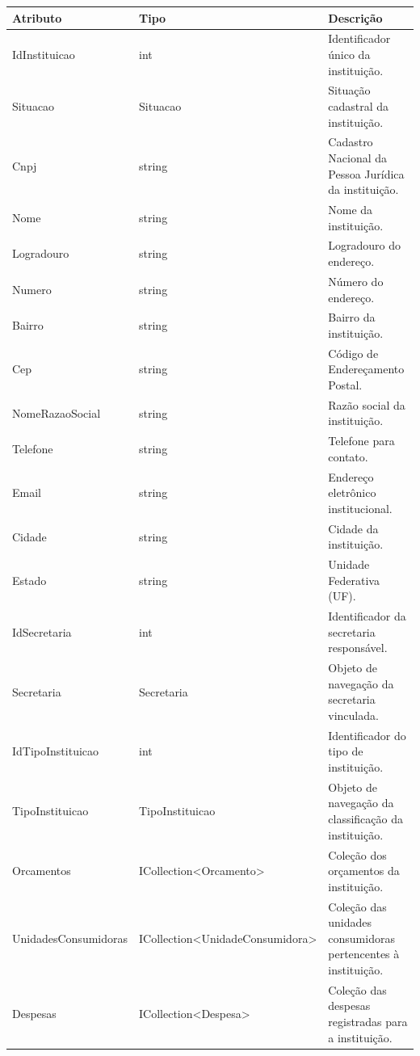 \begin{quadro}[H]
\caption[Dicionário de dados da entidade Instituicao]{Dicionário de dados da entidade Instituicao}
\label{quad:dicionario-de-dados-da-entidade-instituicao}

\begin{tabular}{|p{}|p{}|p{}|}
\hline
\textbf{Atributo} & \textbf{Tipo} & \textbf{Descrição} \\ 
\hline
IdInstituicao & int & Identificador único da instituição. \\ 
\hline
Situacao & Situacao & Situação cadastral da instituição. \\ 
\hline
Cnpj & string & Cadastro Nacional da Pessoa Jurídica da instituição. \\ 
\hline
Nome & string & Nome da instituição. \\ 
\hline
Logradouro & string & Logradouro do endereço. \\ 
\hline
Numero & string & Número do endereço. \\ 
\hline
Bairro & string & Bairro da instituição. \\ 
\hline
Cep & string & Código de Endereçamento Postal. \\ 
\hline
NomeRazaoSocial & string & Razão social da instituição. \\ 
\hline
Telefone & string & Telefone para contato. \\ 
\hline
Email & string & Endereço eletrônico institucional. \\ 
\hline
Cidade & string & Cidade da instituição. \\ 
\hline
Estado & string & Unidade Federativa (UF). \\ 
\hline
IdSecretaria & int & Identificador da secretaria responsável. \\ 
\hline
Secretaria & Secretaria & Objeto de navegação da secretaria vinculada. \\ 
\hline
IdTipoInstituicao & int & Identificador do tipo de instituição. \\ 
\hline
TipoInstituicao & TipoInstituicao & Objeto de navegação da classificação da instituição. \\ 
\hline
Orcamentos & ICollection<Orcamento> & Coleção dos orçamentos da instituição. \\ 
\hline
UnidadesConsumidoras & ICollection<UnidadeConsumidora> & Coleção das unidades consumidoras pertencentes à instituição. \\ 
\hline
Despesas & ICollection<Despesa> & Coleção das despesas registradas para a instituição. \\ 
\hline
\end{tabular}


\end{quadro}



